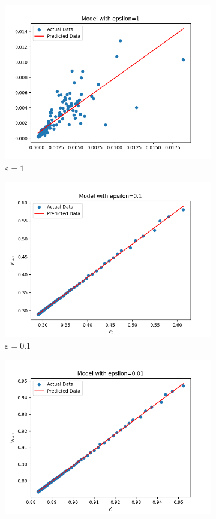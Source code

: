     \begin{figure}[h!]
        \centering
        \begin{subfigure}[b]{0.3\textwidth}
            \includegraphics[width=.9\linewidth]{plots/epsilon_1}
            \caption{$\varepsilon = 1$}
        \end{subfigure} \quad
        \begin{subfigure}[b]{0.3\textwidth}
            \includegraphics[width=.9\linewidth]{plots/epsilon_0.1}
            \caption{$\varepsilon = 0.1$}
        \end{subfigure} \quad
        \begin{subfigure}[b]{0.3\textwidth}
            \includegraphics[width=.9\linewidth]{plots/epsilon_0.01}

\end{subfigure}
\end{figure}
